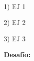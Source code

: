 \documentclass[]{article}
\begin{document}
\begin{center}
    \textbf{\curso}\\
    \ayudantes    
\end{center}

\bigskip

\bigskip

\begin{itemize}
    \item[1)] EJ 1
    \item[2)] EJ 2
    \item[3)] EJ 3
    \[\]
    \item[]\textbf{Desafío:} %
\end{itemize}
\end{document}
